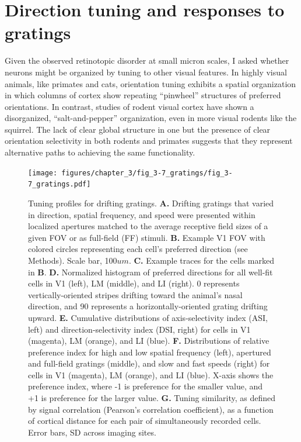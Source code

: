 \section{Direction tuning and responses to gratings}
Given the observed retinotopic disorder at small micron scales, I asked whether neurons might be organized by tuning to other visual features. In highly visual animals, like primates and cats, orientation tuning exhibits a spatial organization in which columns of cortex show repeating ``pinwheel'' structures of preferred orientations. In contrast, studies of rodent visual cortex have shown a disorganized, ``salt-and-pepper'' organization\cite{Ohki2005}, even in more visual rodents like the squirrel\cite{VanHooser2005}. The lack of clear global structure in one but the presence of clear orientation selectivity in both rodents and primates suggests that they represent alternative paths to achieving the same functionality.

\begin{figure}[t!]
    \texttt{[image: figures/chapter\_3/fig\_3-7\_gratings/fig\_3-7\_gratings.pdf]}
    \vspace{.1in}
    \caption[Responses to drifting gratings]{Tuning profiles for drifting gratings.
    \textbf{A.} Drifting gratings that varied in direction, spatial frequency, and speed were presented within localized apertures matched to the average receptive field sizes of a given FOV or as full-field (FF) stimuli.
    \textbf{B.} Example V1 FOV with colored circles representing each cell's preferred direction (see Methods). Scale bar, 100$um$.
    \textbf{C.} Example traces for the cells marked in \textbf{B}. 
    \textbf{D.} Normalized histogram of preferred directions for all well-fit cells in V1 (left), LM (middle), and LI (right). 0 represents vertically-oriented stripes drifting toward the animal's nasal direction, and 90 represents a horizontally-oriented grating drifting upward.
    \textbf{E.} Cumulative distributions of axis-selectivity index (ASI, left) and direction-selectivity index (DSI, right) for cells in V1 (magenta), LM (orange), and LI (blue).
    \textbf{F.} Distributions of relative preference index for high and low spatial frequency (left), apertured and full-field gratings (middle), and slow and fast speeds (right) for cells in V1 (magenta), LM (orange), and LI (blue). X-axis shows the preference index, where -1 is preference for the smaller value, and +1 is preference for the larger value.
    \textbf{G.} Tuning similarity, as defined by signal correlation (Pearson's correlation coefficient), as a function of cortical distance for each pair of simultaneously recorded cells. Error bars, SD across imaging sites.  
    \label{fig:gratings}}
\end{figure}

